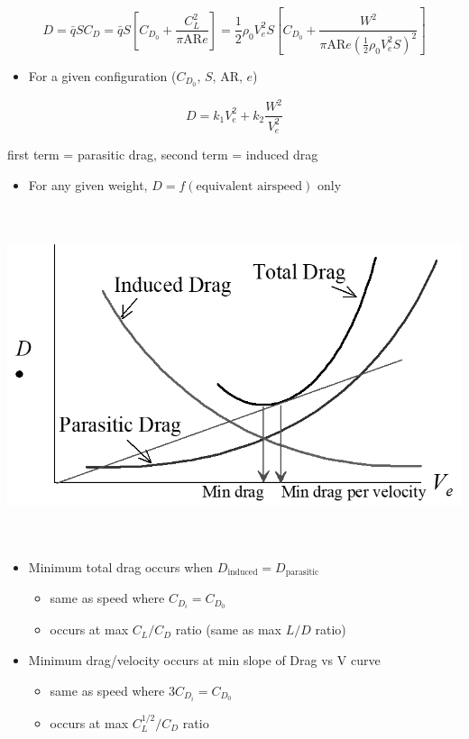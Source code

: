 \documentclass[
]{book}
\providecommand{\tightlist}{%
  \setlength{\itemsep}{0pt}\setlength{\parskip}{0pt}}
\begin{document}
\[D = \bar{q}SC_D = \bar{q}S \left[C_{D_0} + \frac{C_L^2}{\pi \mathrm{AR} e} \right] = \frac{1}{2}\rho_0 V_e^2 S\left[C_{D_0} + \frac{W^2}{\pi \mathrm{AR} e \left(\frac{1}{2} \rho_0 V_e^2 S \right)^2} \right]\]

\begin{itemize}
\tightlist
\item
  For a given configuration (\(C_{D_0} \text{, } S \text{, } \mathrm{AR} \text{, } e\))
\end{itemize}

\[D = k_1 V_e^2 + k_2 \frac{W^2}{V_e^2} \]

first term = parasitic drag, second term = induced drag

\begin{itemize}
\tightlist
\item
  For any given weight, \(D = f(\text{equivalent airspeed})\) only
\end{itemize}

\includegraphics[width=6.7143in,height=3.875in]{media/05/image95.png}

\begin{itemize}
\tightlist
\item
  Minimum total drag occurs when \(D_{\mathrm{induced}} = D_{\mathrm{parasitic}}\)

  \begin{itemize}
  \tightlist
  \item
    same as speed where \(C_{D_i} = C_{D_0}\)
  \item
    occurs at max \(C_L/C_D\) ratio (same as max \(L/D\) ratio)
  \end{itemize}
\item
  Minimum drag/velocity occurs at min slope of Drag vs V curve

  \begin{itemize}
  \tightlist
  \item
    same as speed where \(3C_{D_i} = C_{D_0}\)
  \item
    occurs at max \(C_L^{1/2}/C_D\) ratio
  \end{itemize}
\end{itemize}
\end{document}

